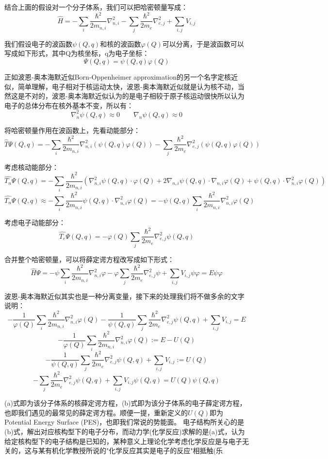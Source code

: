 结合上面的假设对一个分子体系，我们可以把哈密顿量写成：
\[\hat{H}=-\sum_i\frac{\hbar^2}{2m_{n,i}}\nabla^2_{n,i}-\sum_j\frac{\hbar^2}{2m_e}\nabla^2_{e,j}+\sum_{i,j}V_{i,j}\]

我们假设电子的波函数$\psi(Q,q)$和核的波函数$\varphi(Q)$可以分离，于是波函数可以写成如下形式，其中Q为核坐标，q为电子坐标：
\[\varPsi(Q,q)=\psi(Q,q)\varphi(Q)\]

正如波恩-奥本海默近似Born-Oppenheimer approximation的另一个名字定核近似，简单理解，电子相对于核运动太快，波恩-奥本海默近似就是认为核不动，当然这是不对的，波恩-奥本海默近似认为的是电子相较于原子核运动很快所以认为电子的总体分布在核外基本不变，所以有：
\[\nabla^2_n\psi(Q,q) \approx 0 \qquad \nabla_n\psi(Q,q) \approx 0\]

将哈密顿量作用在波函数上，先看动能部分：
\[\hat{T}\varPsi(Q,q)=-\sum_i\frac{\hbar^2}{2m_{n,i}}\nabla^2_{n,i}(\psi(Q,q)\varphi(Q))-\sum_j\frac{\hbar^2}{2m_e}\nabla^2_{e,j}(\psi(Q,q)\varphi(Q))\]

考虑核动能部分：
\[\hat{T_n}\varPsi(Q,q)=-\sum_i\frac{\hbar^2}{2m_{n,i}}\left (\nabla^2_{n,i}\psi(Q,q) \cdot \varphi(Q)+2\nabla_{n,i}\psi(Q,q) \cdot \nabla_{n,i}\varphi(Q)+ \psi(Q,q) \cdot \nabla^2_{n,i}\varphi(Q)  \right )\]
\[\hat{T_n}\varPsi(Q,q) \approx -\sum_i\frac{\hbar^2}{2m_{n,i}}\psi(Q,q) \cdot \nabla^2_{n,i}\varphi(Q)=-\psi(Q,q)\sum_i\frac{\hbar^2}{2m_{n,i}}\nabla^2_{n,i}\varphi(Q)\]

考虑电子动能部分：
\[\hat{T_e}\varPsi(Q,q)=-\varphi(Q)\sum_j\frac{\hbar^2}{2m_e}\nabla^2_{e,j}\psi(Q,q)\]

合并整个哈密顿量，可以将薛定谔方程改写成如下形式：
\[\hat{H}\varPsi=-\psi\sum_i\frac{\hbar^2}{2m_{n,i}}\nabla^2_{n,i}\varphi-\varphi\sum_j\frac{\hbar^2}{2m_e}\nabla^2_{e,j}\psi+\sum_{i,j}V_{i,j}\psi\varphi=E\psi\varphi\]

波恩-奥本海默近似其实也是一种分离变量，接下来的处理我们将不做多余的文字说明：
\[-\frac{1}{\varphi(Q)}\sum_i\frac{\hbar^2}{2m_{n,i}}\nabla^2_{n,i}\varphi(Q)-\frac{1}{\psi(Q,q)}\sum_j\frac{\hbar^2}{2m_e}\nabla^2_{e,j}\psi(Q,q)+\sum_{i,j}V_{i,j}=E\]
\[-\frac{1}{\varphi(Q)}\sum_i\frac{\hbar^2}{2m_{n,i}}\nabla^2_{n,i}\varphi(Q):=E-U(Q) \tag{a}\]
\[-\frac{1}{\psi(Q,q)}\sum_j\frac{\hbar^2}{2m_e}\nabla^2_{e,j}\psi(Q,q)+\sum_{i,j}V_{i,j}:=U(Q)\]
\[-\sum_j\frac{\hbar^2}{2m_e}\nabla^2_{e,j}\psi(Q,q)+\sum_{i,j}V_{i,j}\psi(Q,q)=U(Q)\psi(Q,q) \tag{b}\]

(a)式即为该分子体系的核薛定谔方程，(b)式即为该分子体系的电子薛定谔方程，也即我们遇见的最常见的薛定谔方程。顺便一提，重新定义的$U(Q)$即为Potential Energy Surface (PES)，也即我们常说的势能面。
电子结构所关心的是(b)式，解出对应核构型下的电子分布，而动力学(化学反应)求解的是(a)式，认为给定核构型下的电子结构是已知的，某种意义上理论化学考虑化学反应是与电子无关的，这与某有机化学教授所说的"化学反应其实是电子的反应"相抵触(乐

